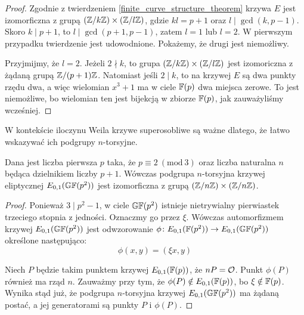 \begin{proof}
Zgodnie z twierdzeniem \ref{finite_curve_structure_theorem}
krzywa $E$ jest izomorficzna z grupą $(\mathbb{Z} / k\mathbb{Z}) \times (\mathbb{Z} / l\mathbb{Z})$,
gdzie $kl = p+1$ oraz $l \mid \gcd(k, p-1)$.
Skoro $k \mid p+1$, to $l \mid \gcd(p+1, p-1)$,
zatem $l = 1$ lub $l = 2$.
W pierwszym przypadku twierdzenie jest udowodnione.
Pokażemy, że drugi jest niemożliwy.

\noindent
Przyjmijmy, że $l = 2$.
Jeżeli $2 \nmid k$,
to grupa $(\mathbb{Z} / k\mathbb{Z}) \times (\mathbb{Z} / l\mathbb{Z})$ jest izomoriczna
z żądaną grupą $\mathbb{Z} / (p+1)\mathbb{Z}$.
Natomiast jeśli $2 \mid k$, to na krzywej $E$ są dwa punkty rzędu dwa,
a więc wielomian $x^3 + 1$ ma w ciele $\mathbb{F}(p)$ dwa miejsca zerowe.
To jest niemożliwe, bo wielomian ten jest bijekcją w zbiorze $\mathbb{F}(p)$,
jak zauważyliśmy wcześniej.
\end{proof}

\noindent
W kontekście iloczynu Weila krzywe superosobliwe są ważne dlatego,
że łatwo wskazywać ich podgrupy $n$-torsyjne.

\begin{theorem}
Dana jest liczba pierwsza $p$ taka, że $p \equiv 2\ (\mathrm{mod}\ 3)$
oraz liczba naturalna $n$ będąca dzielnikiem liczby $p + 1$.
Wówczas podgrupa $n$-torsyjna krzywej eliptycznej $E_{0,1}(\mathbb{GF}(p^2))$
jest izomorficzna z grupą $(\mathbb{Z} / n\mathbb{Z}) \times (\mathbb{Z} / n\mathbb{Z})$.
\end{theorem}

\begin{proof}
Ponieważ $3 \mid p^2-1$, w ciele $\mathbb{GF}(p^2)$
istnieje nietrywialny pierwiastek trzeciego stopnia z jedności.
Oznaczmy go przez $\xi$.
Wówczas automorfizmem krzywej $E_{0,1}(\mathbb{GF}(p^2))$ jest
odwzorowanie $\phi\colon E_{0,1}(\mathbb{F}(p^2)) \to E_{0,1}(\mathbb{GF}(p^2))$
określone następująco:
\begin{equation}\label{supersingular_curve_automorphism_eqn}
\phi(x, y) = (\xi x, y)
\end{equation}

\noindent
Niech $P$ będzie takim punktem krzywej $E_{0,1}(\mathbb{F}(p))$, że $nP = \mathcal{O}$.
Punkt $\phi(P)$ również ma rząd $n$.
Zauważmy przy tym, że $\phi(P) \notin E_{0,1}(\mathbb{F}(p))$,
bo $\xi \notin \mathbb{F}(p)$.
Wynika stąd już, że podgrupa $n$-torsyjna krzywej $E_{0,1}(\mathbb{GF}(p^2))$
ma żądaną postać, a jej generatorami są punkty $P$ i $\phi(P)$.
\end{proof}
